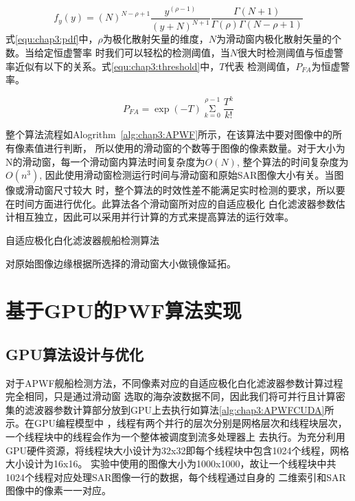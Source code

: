 \begin{equation}
  \label{equ:chap3:pdf}
  {f_y}(y) = {(N)^{N - \rho  + 1}}\frac{{{y^{(\rho  - 1)}}}}{{{{(y + N)}^{N + 1}}}}\frac{{\Gamma (N + 1)}}{{\Gamma (\rho )\Gamma (N - \rho  + 1)}}
\end{equation}
式\ref{equ:chap3:pdf}中，$\rho$为极化散射矢量的维度，$N$为滑动窗内极化散射矢量的个数。当给定恒虚警率
时我们可以轻松的检测阈值，当$N$很大时检测阈值与恒虚警率近似有以下的关系。式\ref{equ:chap3:threshold}中，$T$代表
检测阈值，$P_{FA}$为恒虚警率。

\begin{equation}
  \label{equ:chap3:threshold}
  {P_{FA}} = \exp ( - T)\mathop \Sigma \limits_{k = 0}^{\rho  - 1} \frac{{{T^k}}}{{k!}}
\end{equation}

整个算法流程如Alogrithm~\ref{alg:chap3:APWF}所示，在该算法中要对图像中的所有像素值进行判断，
所以使用的滑动窗的个数等于图像的像素数量。对于大小为N的滑动窗，每一个滑动窗内算法时间复杂度为$O(N)$,
整个算法的时间复杂度为$O(n^3)$, 因此使用滑动窗检测运行时间与滑动窗和原始SAR图像大小有关。当图像或滑动窗尺寸较大
时，整个算法的时效性差不能满足实时检测的要求，所以要在时间方面进行优化。此算法各个滑动窗所对应的自适应极化
白化滤波器参数估计相互独立，因此可以采用并行计算的方式来提高算法的运行效率。

\begin{algorithm}[t]
  \caption{自适应极化白化滤波器舰船检测算法}
  \label{alg:chap3:APWF}
  \BlankLine
  
  对原始图像边缘根据所选择的滑动窗大小做镜像延拓。

 \end{algorithm}

\section{基于GPU的PWF算法实现}

\subsection{GPU算法设计与优化}
 对于APWF舰船检测方法，不同像素对应的自适应极化白化滤波器参数计算过程完全相同，只是通过滑动窗
 选取的海杂波数据不同，因此我们将可并行且计算密集的滤波器参数计算部分放到GPU上去执行如算法\ref{alg:chap3:APWFCUDA}所示。在GPU编程模型中
 ，线程有两个并行的层次分别是网格层次和线程块层次，一个线程块中的线程会作为一个整体被调度到流多处理器上
 去执行。为充分利用GPU硬件资源，将线程块大小设计为32x32即每个线程块中包含1024个线程，网格大小设计为16x16。
 实验中使用的图像大小为1000x1000，故让一个线程块中共1024个线程对应处理SAR图像一行的数据，每个线程通过自身的
 二维索引和SAR图像中的像素一一对应。


